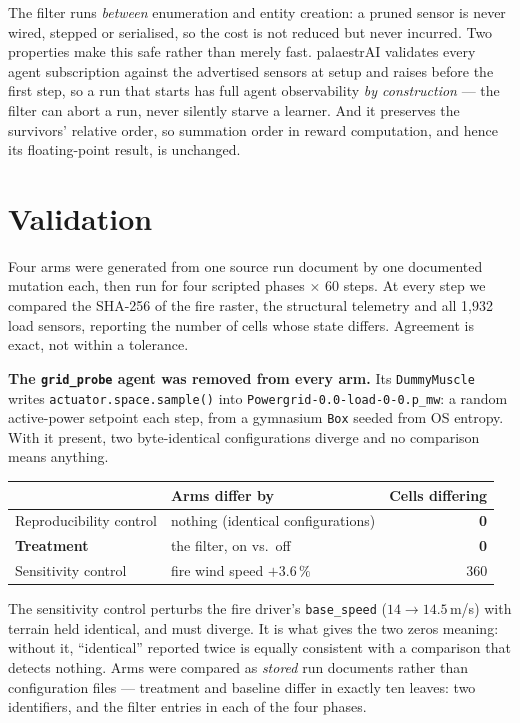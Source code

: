\documentclass[10pt,a4paper]{article}
\newcommand{\x}{$\times$}
\begin{document}
The filter runs \emph{between} enumeration and entity creation: a pruned sensor
is never wired, stepped or serialised, so the cost is not reduced but never
incurred. Two properties make this safe rather than merely fast. palaestrAI
validates every agent subscription against the advertised sensors at setup and
raises before the first step, so a run that starts has full agent observability
\emph{by construction} --- the filter can abort a run, never silently starve a
learner. And it preserves the survivors' relative order, so summation order in
reward computation, and hence its floating-point result, is unchanged.

\section{Validation}
Four arms were generated from one source run document by one documented mutation
each, then run for four scripted phases \x{} 60 steps. At every step we compared
the SHA-256 of the fire raster, the structural telemetry and all 1{,}932 load
sensors, reporting the number of cells whose state differs. Agreement is exact,
not within a tolerance.

\textbf{The \texttt{grid\_probe} agent was removed from every arm.} Its
\texttt{DummyMuscle} writes \texttt{actuator.space.sample()} into
\texttt{Powergrid-0.0-load-0-0.p\_mw}: a random active-power setpoint each step,
from a gymnasium \texttt{Box} seeded from OS entropy. With it present, two
byte-identical configurations diverge and no comparison means anything.

\vspace{0.25em}
\begin{center}
\small
\begin{tabular}{@{}llr@{}}
\toprule
& \textbf{Arms differ by} & \textbf{Cells differing}\\
\midrule
Reproducibility control & nothing (identical configurations) & \textbf{0}\\
\textbf{Treatment}      & the filter, on vs.\ off            & \textbf{0}\\
Sensitivity control     & fire wind speed $+3.6\,\%$         & 360\\
\bottomrule
\end{tabular}
\end{center}
\vspace{-0.15em}

The sensitivity control perturbs the fire driver's \texttt{base\_speed}
($14 \rightarrow 14.5$\,m/s) with terrain held identical, and must diverge. It is
what gives the two zeros meaning: without it, ``identical'' reported twice is
equally consistent with a comparison that detects nothing. Arms were compared as
\emph{stored} run documents rather than configuration files --- treatment and
baseline differ in exactly ten leaves: two identifiers, and the filter entries in
each of the four phases.
\end{document}
